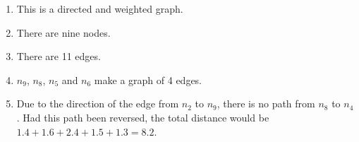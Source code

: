 \begin{enumerate}
  \item This is a directed and weighted graph.
  \item There are nine nodes.
  \item There are 11 edges.
  \item $n_9$, $n_8$, $n_5$ and $n_6$ make a graph of 4 edges.
  \item Due to the direction of the edge from $n_2$ to $n_9$, there is no path from $n_8$ to $n_4$. Had this path been reversed, the total distance would be $1.4+1.6+2.4+1.5+1.3=8.2$.
\end{enumerate}
